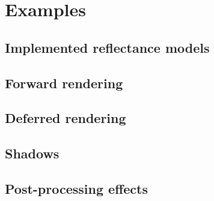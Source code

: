 
\chapter{ Examples }
\label{Chapter6}


\section{Implemented reflectance models}
\section{Forward rendering}
\section{Deferred rendering}
\section{Shadows}
\section{Post-processing effects}